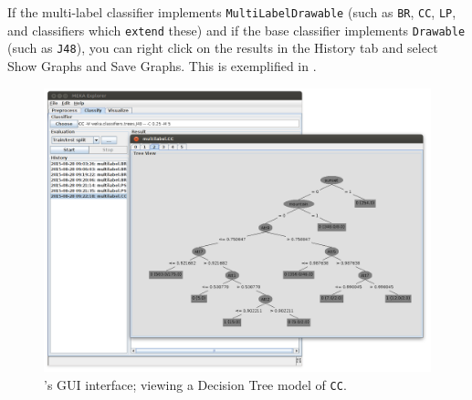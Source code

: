 \documentclass[11pt]{article}
\newcommand{\MEKA}{Meka}
\begin{document}

If the multi-label classifier implements \texttt{MultiLabelDrawable} (such as \texttt{BR}, \texttt{CC}, \texttt{LP}, and classifiers which \texttt{extend} these) and if the base classifier implements \texttt{Drawable} (such as \texttt{J48}), you can right click on the results in the \textsf{History} tab and select \textsf{Show Graphs} and \textsf{Save Graphs}. This is exemplified in .

\begin{figure}
	\centering
	\includegraphics[height=0.75\textwidth]{GUI05.png}
	\caption{\label{screen:graphs} 's GUI interface; viewing a Decision Tree model of \texttt{CC}.}
\end{figure}
\end{document}
